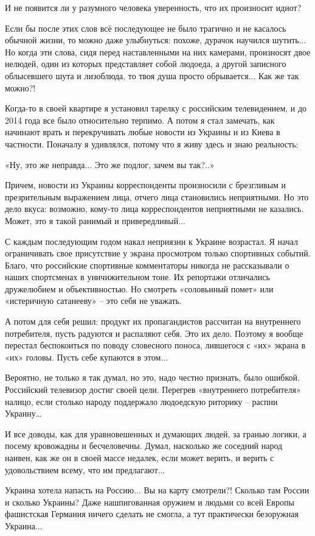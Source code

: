 И не появится ли у разумного человека уверенность, что их произносит идиот?

Если бы после этих слов всё последующее не было трагично и не касалось обычной
жизни, то можно даже улыбнуться: похоже, дурачок научился шутить... Но когда
эти слова, сидя перед наставленными на них камерами, произносят двое нелюдей,
один из которых представляет собой людоеда, а другой записного облысевшего шута
и лизоблюда, то твоя душа просто обрывается... Как же так можно?!

Когда-то в своей квартире я установил тарелку с российским телевидением, и до
2014 года все было относительно терпимо. А потом я стал замечать, как начинают
врать и перекручивать любые новости из Украины и из Киева в частности. Поначалу
я удивлялся, потому что я живу здесь и знаю реальность:

«Ну, это же неправда... Это же подлог, зачем вы так?..»

Причем, новости из Украины корреспонденты произносили с брезгливым и
презрительным выражением лица, отчего лица становились неприятными. Но это дело
вкуса: возможно, кому-то лица корреспондентов неприятными не казались. Может,
это я такой ранимый и привередливый...

С каждым последующим годом накал неприязни к Украине возрастал. Я начал
ограничивать свое присутствие у экрана просмотром только спортивных событий.
Благо, что российские спортивные комментаторы никогда не рассказывали о наших
спортсменах в уничижительном тоне. Их репортажи отличались дружелюбием и
объективностью. Но смотреть «соловьиный помет» или «истеричную сатанееву» – это
себя не уважать.

А потом для себя решил: продукт их пропагандистов рассчитан на внутреннего
потребителя, пусть радуются и распаляют себя. Это их дело. Поэтому я вообще
перестал беспокоиться по поводу словесного поноса, лившегося с «их» экрана в
«их» головы. Пусть себе купаются в этом...

Вероятно, не только я так думал, но это, надо честно признать, было ошибкой.
Российский телевизор достиг своей цели. Перегрев «внутреннего потребителя»
налицо, если столько народу поддержало людоедскую риторику – распни Украину…

И все доводы, как для уравновешенных и думающих людей, за гранью логики, а
посему кровожадны и бесчеловечны. Думал, насколько же соседний народ наивен,
как же он в своей массе недалек, если может верить, и верить с удовольствием
всему, что им предлагают...

Украина хотела напасть на Россию... Вы на карту смотрели?! Сколько там России и
сколько Украины? Даже нашпигованная оружием и людьми со всей Европы фашистская
Германия ничего сделать не смогла, а тут практически безоружная Украина...

